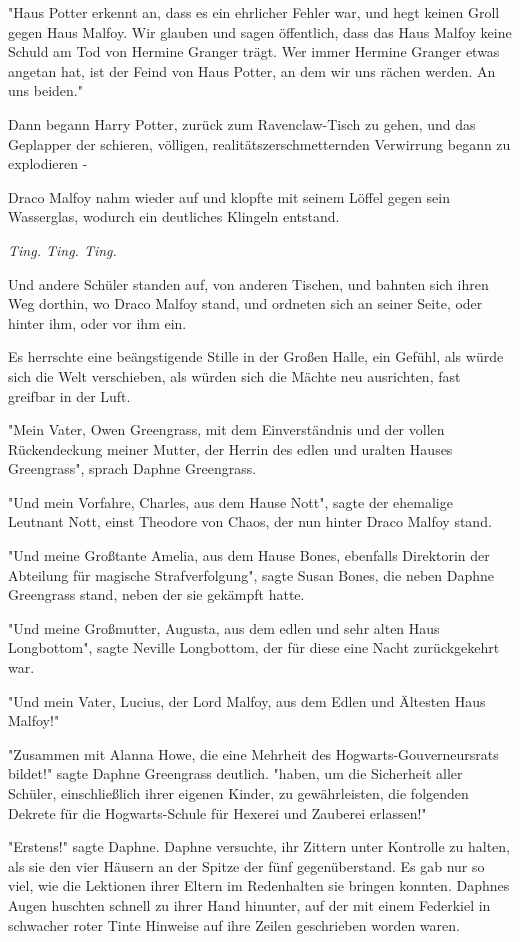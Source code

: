 {"Haus Potter erkennt an, dass es ein ehrlicher Fehler war, und hegt keinen Groll gegen Haus Malfoy. Wir glauben und sagen öffentlich, dass das Haus Malfoy keine Schuld am Tod von Hermine Granger trägt. Wer immer Hermine Granger etwas angetan hat, ist der Feind von Haus Potter, an dem wir uns rächen werden. An uns beiden."

Dann begann Harry Potter, zurück zum Ravenclaw-Tisch zu gehen, und das Geplapper der schieren, völligen, realitätszerschmetternden Verwirrung begann zu explodieren -

Draco Malfoy nahm wieder auf und klopfte mit seinem Löffel gegen sein Wasserglas, wodurch ein deutliches Klingeln entstand.

\emph{Ting. Ting. Ting.}

Und andere Schüler standen auf, von anderen Tischen, und bahnten sich ihren Weg dorthin, wo Draco Malfoy stand, und ordneten sich an seiner Seite, oder hinter ihm, oder vor ihm ein.

Es herrschte eine beängstigende Stille in der Großen Halle, ein Gefühl, als würde sich die Welt verschieben, als würden sich die Mächte neu ausrichten, fast greifbar in der Luft.

"Mein Vater, Owen Greengrass, mit dem Einverständnis und der vollen Rückendeckung meiner Mutter, der Herrin des edlen und uralten Hauses Greengrass", sprach Daphne Greengrass.

"Und mein Vorfahre, Charles, aus dem Hause Nott", sagte der ehemalige Leutnant Nott, einst Theodore von Chaos, der nun hinter Draco Malfoy stand.

"Und meine Großtante Amelia, aus dem Hause Bones, ebenfalls Direktorin der Abteilung für magische Strafverfolgung", sagte Susan Bones, die neben Daphne Greengrass stand, neben der sie gekämpft hatte.

"Und meine Großmutter, Augusta, aus dem edlen und sehr alten Haus Longbottom", sagte Neville Longbottom, der für diese eine Nacht zurückgekehrt war.

"Und mein Vater, Lucius, der Lord Malfoy, aus dem Edlen und Ältesten Haus Malfoy!"

"Zusammen mit Alanna Howe, die eine Mehrheit des Hogwarts-Gouverneursrats bildet!" sagte Daphne Greengrass deutlich. "haben, um die Sicherheit aller Schüler, einschließlich ihrer eigenen Kinder, zu gewährleisten, die folgenden Dekrete für die Hogwarts-Schule für Hexerei und Zauberei erlassen!"

"Erstens!" sagte Daphne. Daphne versuchte, ihr Zittern unter Kontrolle zu halten, als sie den vier Häusern an der Spitze der fünf gegenüberstand. Es gab nur so viel, wie die Lektionen ihrer Eltern im Redenhalten sie bringen konnten. Daphnes Augen huschten schnell zu ihrer Hand hinunter, auf der mit einem Federkiel in schwacher roter Tinte Hinweise auf ihre Zeilen geschrieben worden waren.

}
